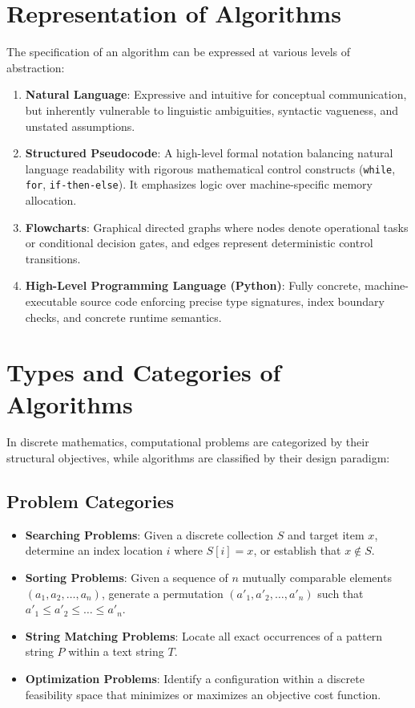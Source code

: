 \section{Representation of Algorithms}
The specification of an algorithm can be expressed at various levels of abstraction:
\begin{enumerate}
    \item \textbf{Natural Language}: Expressive and intuitive for conceptual communication, but inherently vulnerable to linguistic ambiguities, syntactic vagueness, and unstated assumptions.
    \item \textbf{Structured Pseudocode}: A high-level formal notation balancing natural language readability with rigorous mathematical control constructs (\texttt{while}, \texttt{for}, \texttt{if-then-else}). It emphasizes logic over machine-specific memory allocation.
    \item \textbf{Flowcharts}: Graphical directed graphs where nodes denote operational tasks or conditional decision gates, and edges represent deterministic control transitions.
    \item \textbf{High-Level Programming Language (Python)}: Fully concrete, machine-executable source code enforcing precise type signatures, index boundary checks, and concrete runtime semantics.
\end{enumerate}

\section{Types and Categories of Algorithms}
In discrete mathematics, computational problems are categorized by their structural objectives, while algorithms are classified by their design paradigm:

\subsection{Problem Categories}
\begin{itemize}
    \item \textbf{Searching Problems}: Given a discrete collection $S$ and target item $x$, determine an index location $i$ where $S[i] = x$, or establish that $x \notin S$.
    \item \textbf{Sorting Problems}: Given a sequence of $n$ mutually comparable elements $(a_1, a_2, \dots, a_n)$, generate a permutation $(a'_1, a'_2, \dots, a'_n)$ such that $a'_1 \le a'_2 \le \dots \le a'_n$.
    \item \textbf{String Matching Problems}: Locate all exact occurrences of a pattern string $P$ within a text string $T$.
    \item \textbf{Optimization Problems}: Identify a configuration within a discrete feasibility space that minimizes or maximizes an objective cost function.
\end{itemize}

